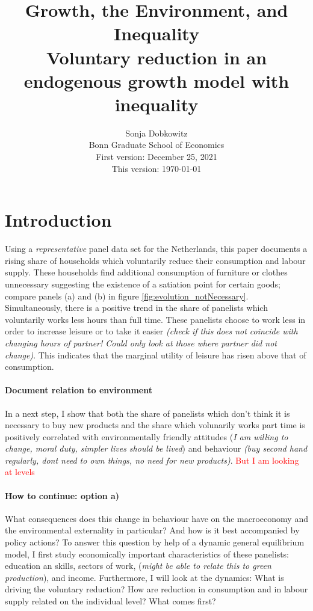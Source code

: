\documentclass[12pt]{article}
\title{Growth, the Environment, and Inequality\\ \small{ Voluntary reduction in an endogenous growth model with inequality}}
\date{Sonja Dobkowitz\\ Bonn Graduate School of Economics\\ %
	\vspace{1mm}
	First version: December 25, 2021\\
	This version: \today }
\newcommand{\tr}[1]{\textcolor{red}{#1}}
\begin{document}
	\maketitle
	
\section{Introduction}
Using a \textit{representative} panel data set for the Netherlands, this paper documents a rising share of households which voluntarily reduce their consumption and labour supply. These households find additional consumption of furniture or clothes unnecessary suggesting the existence of a satiation point for certain goods; compare panels (a) and (b) in figure \ref{fig:evolution_notNecessary}. Simultaneously, there is a positive trend in the share of panelists which voluntarily works less hours than full time. These panelists choose to work less in order to increase leisure or to take it easier \textit{(check if this does not coincide with changing hours of partner! Could only look at those where partner did not change)}. This indicates that the marginal utility of leisure  has risen above that of consumption. 

\paragraph{Document relation to environment}
In a next step, I show that both the share of panelists which don't think it is necessary to buy new products and the share which volunarily works part time is positively correlated with environmentally friendly attitudes (\textit{I am willing to change, moral duty, simpler lives should be lived}) and behaviour \textit{(buy second hand regularly, dont need to own things, no need for new products)}. \tr{But I am looking at levels}

\paragraph{How to continue: option a)}
What consequences does this change in behaviour have on the macroeconomy and the environmental externality in particular? And how is it best accompanied by policy actions?
To answer this question by help of a dynamic general equilibrium model, I first study economically important characteristics of these panelists: education an skills, sectors of work, (\textit{might be able to relate this to green production}), and income. 
Furthermore, I will look at the dynamics: 
What is driving the voluntary reduction? How are reduction in consumption and in labour supply related on the individual level?  What comes first?
\end{document}
